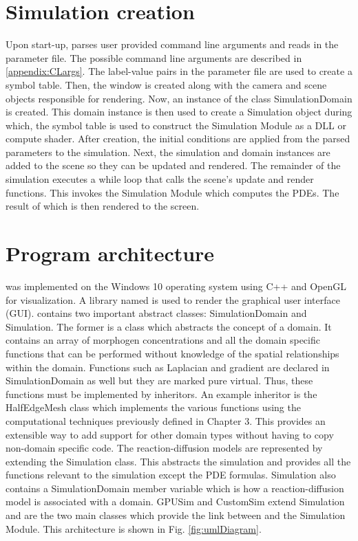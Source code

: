 \section{Simulation creation}
Upon start-up, \ProgramName{} parses user provided command line arguments and reads in the parameter file. The possible command line arguments are described in \ref{appendix:CLargs}. The label-value pairs in the parameter file are used to create a symbol table. Then, the window is created along with the camera and scene objects responsible for rendering. Now, an instance of the class SimulationDomain is created. This domain instance is then used to create a Simulation object during which, the symbol table is used to construct the Simulation Module as a DLL or compute shader. After creation, the initial conditions are applied from the parsed parameters to the simulation. Next, the simulation and domain instances are added to the scene so they can be updated and rendered. The remainder of the simulation executes a while loop that calls the scene's update and render functions. This invokes the Simulation Module which computes the PDEs. The result of which is then rendered to the screen.


\section{Program architecture} 
\ProgramName{} was implemented on the Windows 10 operating system using C++ and OpenGL for visualization. A library named  \citep{cornut2019} is used to render the graphical user interface (GUI). \ProgramName{} contains two important abstract classes: SimulationDomain and Simulation. The former is a class which abstracts the concept of a domain. It contains an array of morphogen concentrations and all the domain specific functions that can be performed without knowledge of the spatial relationships within the domain. Functions such as Laplacian and gradient are declared in SimulationDomain as well but they are marked pure virtual. Thus, these functions must be implemented by inheritors. An example inheritor is the HalfEdgeMesh class which implements the various functions using the computational techniques previously defined in Chapter 3. This provides an extensible way to add support for other domain types without having to copy non-domain specific code. The reaction-diffusion models are represented by extending the Simulation class. This abstracts the simulation and provides all the functions relevant to the simulation except the PDE formulas. Simulation also contains a SimulationDomain member variable which is how a reaction-diffusion model is associated with a domain. GPUSim and CustomSim extend Simulation and are the two main classes which provide the link between \ProgramName{} and the Simulation Module. This architecture is shown in Fig. \ref{fig:umlDiagram}.

